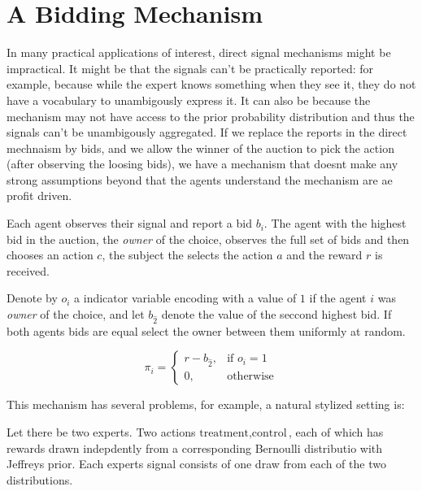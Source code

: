 \section{A Bidding Mechanism}

In many practical applications of interest, direct signal mechanisms might be impractical. It might be that the signals can't be practically reported: for example, because while the expert knows something when they see it, they do not have a vocabulary to unambigously express it. It can also be because the mechanism may not have access to the prior  probability distribution and thus the signals can't be unambigously aggregated. 
If we replace the reports in the direct mechnaism by bids, and we allow the winner of the auction to pick the action (after observing the loosing bids), we have a mechanism that doesnt make any strong assumptions beyond that the agents understand the mechanism are ae profit driven.



\begin{mech}

Each agent observes their signal and report a bid $b_i$.
The agent with the highest bid in the auction, the \emph{owner} of the choice, observes the full set of bids and then chooses an action $c$, the subject the selects the action $a$ and the reward $r$ is received. 

Denote by $o_{i}$ a indicator variable encoding with a value of $1$ if the agent $i$ was  \emph{owner} of the choice, and let $b_{\hat{2}}$ denote the value of the seccond highest  bid. If both agents bids are equal  select the owner between them uniformly at random.

\[
    \pi_i =  
\begin{cases}
        r - b_{\hat{2}} ,& \text{if } o_{i} = 1 \\
		0,              & \text{otherwise}
\end{cases}
\]
\end{mech}


This mechanism has several problems, for example, a natural stylized setting is:


\begin{eg}\label{eg:two-iid-signals}
	Let there be two experts. Two actions ${\text{treatment},\text{control}}$, each of which has rewards drawn indepdently from a corresponding Bernoulli distributio with Jeffreys prior. Each experts signal consists of one draw from each of the two distributions.
\end{eg}

